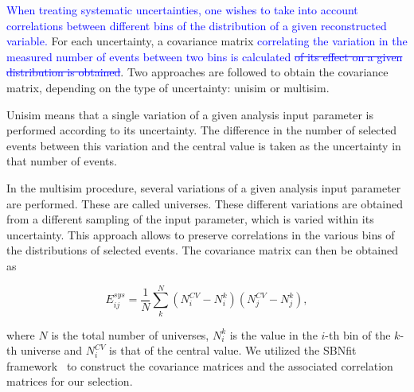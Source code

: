 \documentclass[a4paper]{article}
\begin{document}
\textcolor{blue}{When treating systematic uncertainties, one wishes to take into account correlations between different bins of the distribution of a given reconstructed variable.} For each uncertainty, a covariance matrix \textcolor{blue}{correlating the variation in the measured number of events between two bins is calculated \st{of its effect on a given distribution is obtained}}. Two approaches are followed to obtain the covariance matrix, depending on the type of uncertainty: unisim or multisim.

Unisim means that a single variation of a given analysis input parameter is performed according to its uncertainty. The difference in the number of selected events between this variation and the central value is taken as the uncertainty in that number of events.

In the multisim procedure, several variations of a given analysis input parameter are performed. These are called universes. These different variations are obtained from a different sampling of the input parameter, which is varied within its uncertainty. This approach allows to preserve correlations in the various bins of the distributions of selected events. The covariance matrix can then be obtained as

\begin{equation}
    E_{ij}^{sys} = \frac{1}{N}\sum_{k}^N (N_i^{CV} - N_i^k)(N_j^{CV} - N_j^k) ,
\end{equation}

where $N$ is the total number of universes, $N_i^k$ is the value in the
$i$-th bin of the $k$-th universe and $N_i^{CV}$ is that of the central value. We utilized the SBNfit framework~\cite{bib:bib:sbnfit20437} to construct the covariance matrices and the associated correlation matrices for our selection.
\end{document}
